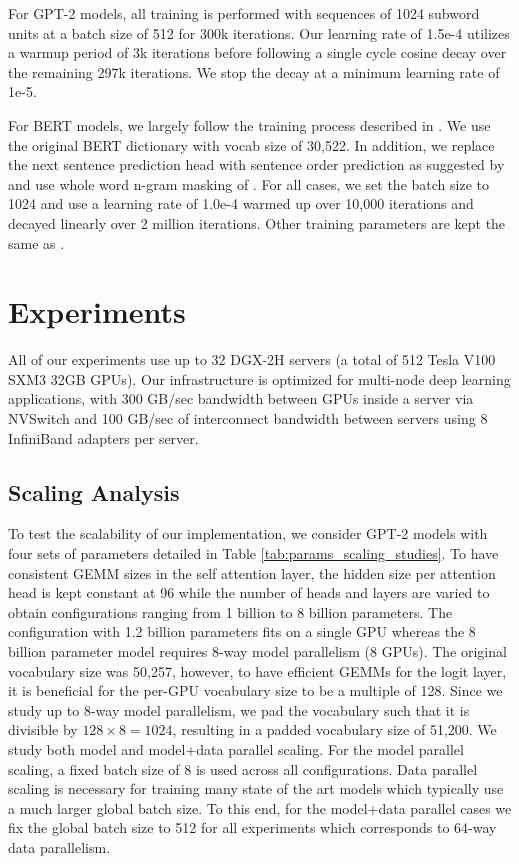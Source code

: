 \documentclass{article}
\begin{document}
For GPT-2 models, all training is performed with sequences of 1024 subword units at a batch size of 512 for 300k iterations. Our learning rate of 1.5e-4 utilizes a warmup period of 3k iterations before following a single cycle cosine decay over the remaining 297k iterations. We stop the decay at a minimum learning rate of 1e-5.

For BERT models, we largely follow the training process described in \cite{ALBERT2019}. We use the original BERT dictionary with vocab size of 30,522. In addition, we replace the next sentence prediction head with sentence order prediction as suggested by \cite{ALBERT2019} and use whole word n-gram masking of \cite{SpanBERT2019}. For all cases, we set the batch size to 1024 and use a learning rate of 1.0e-4 warmed up over 10,000 iterations and decayed linearly over 2 million iterations. Other training parameters are kept the same as \cite{devlin2018bert}.

\section{Experiments}

All of our experiments use up to 32 DGX-2H servers (a total of 512 Tesla V100 SXM3 32GB GPUs). Our infrastructure is optimized for multi-node deep learning applications, with 300 GB/sec bandwidth between GPUs inside a server via NVSwitch and 100 GB/sec of interconnect bandwidth between servers using 8 InfiniBand adapters per server.

\subsection{Scaling Analysis}
To test the scalability of our implementation, we consider GPT-2 models with four sets of parameters detailed in Table \ref{tab:params_scaling_studies}. To have consistent GEMM sizes in the self attention layer, the hidden size per attention head is kept constant at 96 while the number of heads and layers are varied to obtain configurations ranging from 1 billion to 8 billion parameters. The configuration with 1.2 billion parameters fits on a single GPU whereas the 8 billion parameter model requires 8-way model parallelism (8 GPUs). The original vocabulary size was 50,257, however, to have efficient GEMMs for the logit layer, it is beneficial for the per-GPU vocabulary size to be a multiple of 128. Since we study up to 8-way model parallelism, we pad the vocabulary such that it is divisible by $128\times 8=1024$, resulting in a padded vocabulary size of 51,200.  We study both model and model+data parallel scaling. For the model parallel scaling, a fixed batch size of 8 is used across all configurations. Data parallel scaling is necessary for training many state of the art models which typically use a much larger global batch size. To this end, for the model+data parallel cases we fix the global batch size to 512 for all experiments which corresponds to 64-way data parallelism. 
\end{document}
